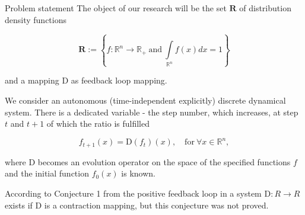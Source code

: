 \documentclass[10pt]{beamer}
\begin{document}
    \begin{frame}{Problem statement}
        The object of our research will be the set $\mathbf{R}$ of distribution density functions
    
        \begin{equation*}
            \mathbf{R} := \left\{f : \mathbb{R}^n \rightarrow \mathbb{R}_+ ~\text{and}~ \int\limits_{\mathbb{R}^n}f(x)dx = 1\right\}
        \end{equation*}
    
        and a mapping $\text{D}$ as feedback loop mapping.

        We consider an autonomous (time-independent explicitly) discrete dynamical system. There is a dedicated variable - the step number, which increases, at step $t$ and $t+1$ of which the ratio is fulfilled

        \begin{equation*}
            f_{t+1}(x) = \text{D}(f_t)(x), \quad \text{for}~ \forall x \in \mathbb{R}^n,
        \end{equation*}
    
        where $\text{D}$ becomes an evolution operator on the space of the specified functions $f$ and the initial function $f_0(x)$ is known.

        According to Conjecture 1 from \cite{khritankov2021hidden} the positive feedback loop in a system $\text{D} : R \rightarrow R$ exists if $\text{D}$ is a contraction mapping, but this conjecture was not proved.
        
    \end{frame}
\end{document}
